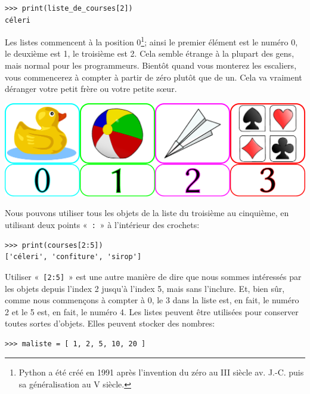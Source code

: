 \begin{Verbatim}[frame=single,rulecolor=\color{mbleu}, label=à taper]
>>> print(liste_de_courses[2])
céleri
\end{Verbatim}

Les listes commencent à la position 0\footnote{Python a été créé en 1991 après l'invention du zéro au III siècle av. J.-C. puis sa généralisation au V siècle.}; ainsi le premier élément est le numéro 0, le deuxième est 1, le troisième est 2. Cela semble étrange à la plupart des gens, mais normal pour les programmeurs. Bientôt quand vous monterez les escaliers, vous commencerez à compter à partir de zéro plutôt que de un. Cela va vraiment déranger votre petit frère ou votre petite sœur.\\

\begin{center}
\includegraphics[scale=0.7]{images/liste.pdf} 

\end{center}
Nous pouvons utiliser tous les objets de la liste du troisième au cinquième, en utilisant deux points «~\verb+:+~» à l'intérieur des crochets:

\begin{Verbatim}[frame=single,rulecolor=\color{mbleu}, label=à taper]
>>> print(courses[2:5])
['céleri', 'confiture', 'sirop']
\end{Verbatim}

Utiliser «~\verb+[2:5]+~» est une autre manière de dire que nous sommes intéressés par les objets depuis l'index 2 jusqu'à l'index 5, mais sans l'inclure. Et, bien sûr, comme nous commençons à compter à 0, le 3 dans la liste est, en fait, le numéro 2 et le 5 est, en fait, le numéro 4. Les listes peuvent être utilisées pour conserver toutes sortes d'objets. Elles peuvent stocker des nombres:\\


\begin{Verbatim}[frame=single,rulecolor=\color{mbleu}, label=à taper]
>>> maliste = [ 1, 2, 5, 10, 20 ]
\end{Verbatim}

